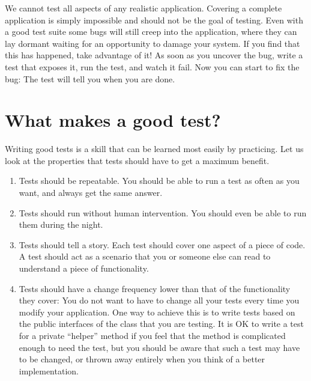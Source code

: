 \documentclass[a4paper,10pt,twoside]{book}
\begin{document}

We cannot test all aspects of any realistic application.
Covering a complete application is simply impossible and should not be the goal of testing.
Even with a good test suite some bugs will still creep into the application, where they can lay dormant waiting for an opportunity to damage your system.
If you find that this has happened, take advantage of it!
As soon as you uncover the bug, write a test that exposes it, run the test, and watch it fail.
Now you can start to fix the bug:
The test will tell you when you are done.
\section{What makes a good test?}

Writing good tests is a skill that can be learned most easily by practicing.
Let us look at the properties that tests should have to get a maximum benefit.

\begin{enumerate}
\item Tests should be repeatable.
	You should be able to run a test as often as you want, and always get the same answer.

\item Tests should run without human intervention.
	You should even be able to run them during the night.

\item Tests should tell a story.
	Each test should cover one aspect of a piece of code.
	A test should act as a scenario that you or someone else can read to understand a piece of functionality.
	\label{prop:oneAspect}

\item Tests should have a change frequency lower than that of the functionality they cover:
	You do not want to have to change all your tests every time you modify your application.
	One way to achieve this is to write tests based on the public interfaces of the class that you are testing.  
	It is OK to write a test for a private ``helper'' method if you feel that the method is complicated enough to need the test, but you should be aware that such a test may have to be changed, or thrown away entirely when you think of a better implementation.
\end{enumerate}
\end{document}
